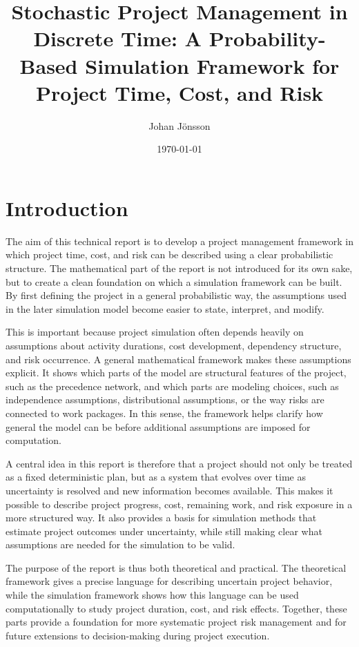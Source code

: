 \documentclass[11pt,a4paper]{article}
\title{Stochastic Project Management in Discrete Time: A Probability-Based Simulation Framework for Project Time, Cost, and Risk}
\author{Johan Jönsson}
\date{\today}
\newcommand{\1}{\mathbf{1}}
\theoremstyle{definition}
\theoremstyle{plain}
\theoremstyle{remark}
\numberwithin{equation}{section}
\begin{document}
\maketitle



\tableofcontents
\newpage

\section{Introduction}

The aim of this technical report is to develop a project management framework in which project time, cost, and risk can be described using a clear probabilistic structure. The mathematical part of the report is not introduced for its own sake, but to create a clean foundation on which a simulation framework can be built. By first defining the project in a general probabilistic way, the assumptions used in the later simulation model become easier to state, interpret, and modify.

This is important because project simulation often depends heavily on assumptions about activity durations, cost development, dependency structure, and risk occurrence. A general mathematical framework makes these assumptions explicit. It shows which parts of the model are structural features of the project, such as the precedence network, and which parts are modeling choices, such as independence assumptions, distributional assumptions, or the way risks are connected to work packages. In this sense, the framework helps clarify how general the model can be before additional assumptions are imposed for computation.

A central idea in this report is therefore that a project should not only be treated as a fixed deterministic plan, but as a system that evolves over time as uncertainty is resolved and new information becomes available. This makes it possible to describe project progress, cost, remaining work, and risk exposure in a more structured way. It also provides a basis for simulation methods that estimate project outcomes under uncertainty, while still making clear what assumptions are needed for the simulation to be valid.

The purpose of the report is thus both theoretical and practical. The theoretical framework gives a precise language for describing uncertain project behavior, while the simulation framework shows how this language can be used computationally to study project duration, cost, and risk effects. Together, these parts provide a foundation for more systematic project risk management and for future extensions to decision-making during project execution.
\end{document}
